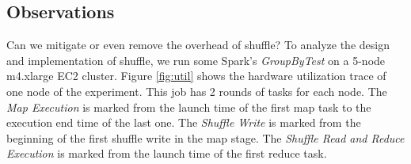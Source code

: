

\subsection{Observations} \label{observation}
Can we mitigate or even remove the overhead of shuffle?
To analyze the design and implementation of shuffle, we run some Spark's \textit{GroupByTest} on a 5-node m4.xlarge EC2 cluster.
Figure \ref{fig:util} shows the hardware utilization trace of one node of the experiment.
This job has 2 rounds of tasks for each node.
The \textit{Map Execution} is marked from the launch time of the first map task to the execution end time of the last one. 
The \textit{Shuffle Write} is marked from the beginning of the first shuffle write in the map stage. 
The \textit{Shuffle Read and Reduce Execution} is marked from the launch time of the first reduce task.
